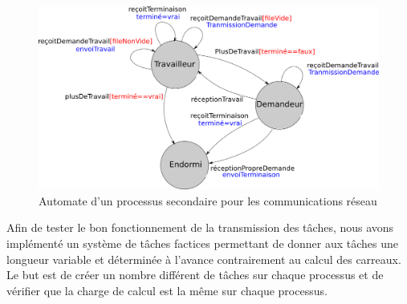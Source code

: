 \begin{figure}[H]
\centering
\includegraphics[width=1\textwidth]{automate.png}
\caption{Automate d'un processus secondaire pour les communications réseau}
\label{fig:diff}
\end{figure}

Afin de tester le bon fonctionnement de la transmission des tâches, nous avons implémenté un système de tâches factices permettant de donner aux tâches une longueur variable et déterminée à l'avance contrairement au calcul des carreaux. Le but est de créer un nombre différent de tâches sur chaque processus et de vérifier que la charge de calcul est la même sur chaque processus.

